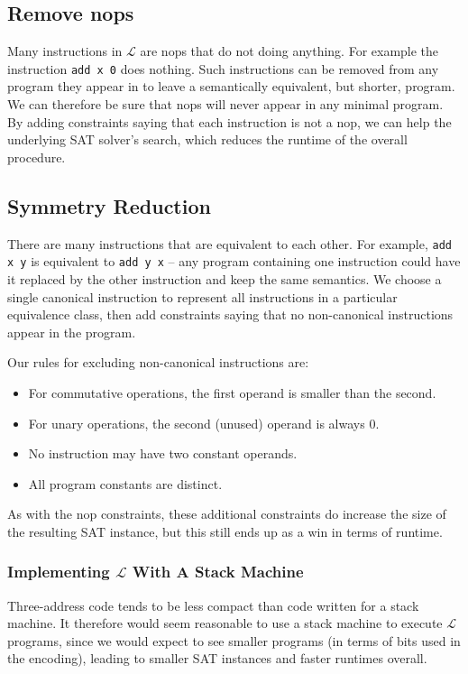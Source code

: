 \documentclass[a4paper]{llncs}
\begin{document}
\subsection{Remove nops}
Many instructions in $\mathcal{L}$ are nops that do not doing anything.
For example the instruction \verb|add x 0| does nothing.  Such instructions
can be removed from any program they appear in to leave a semantically
equivalent, but shorter, program.  We can therefore be sure that nops
will never appear in any minimal program.  By adding constraints saying that
each instruction is not a nop, we can help the underlying SAT solver's
search, which reduces the runtime of the overall procedure.

\subsection{Symmetry Reduction}
There are many instructions that are equivalent to each other.  For example,
\verb|add x y| is equivalent to \verb|add y x| -- any program containing
one instruction could have it replaced by the other instruction and
keep the same semantics.  We choose a single canonical instruction to
represent all instructions in a particular equivalence class, then add
constraints saying that no non-canonical instructions appear in the program.

Our rules for excluding non-canonical instructions are:

\begin{itemize}
 \item For commutative operations, the first operand is smaller than the second.
 \item For unary operations, the second (unused) operand is always 0.
 \item No instruction may have two constant operands.
 \item All program constants are distinct.
\end{itemize}

As with the nop constraints, these additional constraints do increase the
size of the resulting SAT instance, but this still ends up as a win in
terms of runtime.

\subsubsection{Implementing $\mathcal{L}$ With A Stack Machine}
Three-address code tends to be less compact than code written for a stack
machine.  It therefore would seem reasonable to use a stack machine to
execute $\mathcal{L}$ programs, since we would expect to see smaller programs
(in terms of bits used in the encoding), leading to smaller SAT instances
and faster runtimes overall.
\end{document}
